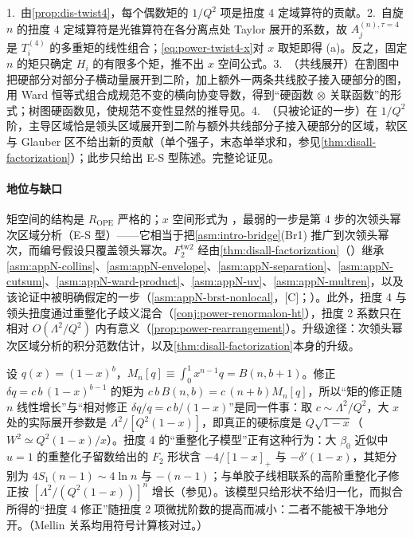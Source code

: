 \begin{proofsketch}
1.~由\cref{prop:dis-twist4}，每个偶数矩的 $1/Q^2$ 项是扭度 4 定域算符的贡献。2.~自旋 $n$ 的扭度 4 定域算符是光锥算符在各分离点处 Taylor 展开的系数，故 $A^{(n),\tau=4}_j$ 是 $T^{(4)}_i$ 的多重矩的线性组合；\eqref{eq:power-twist4-x}对 $x$ 取矩即得 (a)。反之，固定 $n$ 的矩只确定 $H_i$ 的有限多个矩，推不出 $x$ 空间公式。3.~（共线展开）在割图中把硬部分对部分子横动量展开到二阶，加上额外一两条共线胶子接入硬部分的图，用 Ward 恒等式组合成规范不变的横向协变导数，得到“硬函数 $\otimes$ 关联函数”的形式\cite{EllisFurmanskiPetronzio1982,EllisFurmanskiPetronzio1983}；树图硬函数见\cite{Jaffe:1982pm,EllisFurmanskiPetronzio1983}，使规范不变性显然的推导见\cite{Qiu:1988dn}。4.~（只被论证的一步）在 $1/Q^2$ 阶，主导区域恰是领头区域展开到二阶与额外共线部分子接入硬部分的区域，软区与 Glauber 区不给出新的贡献（单个强子，末态单举求和，参见\cref{thm:disall-factorization}）；此步只给出 E-S 型陈述。完整论证见\cite{EllisFurmanskiPetronzio1983,Qiu:1988dn}。
\end{proofsketch}

\paragraph{地位与缺口}
矩空间的结构是 $R_{\mathrm{OPE}}$ 严格的；$x$ 空间形式为 \tagA，最弱的一步是第 4 步的次领头幂次区域分析（E-S 型）——它相当于把\cref{asm:intro-bridge}(Br1) 推广到次领头幂次，而编号假设只覆盖领头幂次。$F_2^{\mathrm{tw2}}$ 经由\cref{thm:disall-factorization}（\tagA）继承 \cref{asm:appN-collins}、\cref{asm:appN-envelope}、\cref{asm:appN-separation}、\cref{asm:appN-cutsum}、\cref{asm:appN-ward-product}、\cref{asm:appN-uv}、\cref{asm:appN-multren}，以及该论证中被明确假定的一步（\cref{asm:appN-brst-nonlocal}，[C]；\cite[第~11.3.2~节]{Collins2011}）。此外，扭度 4 与领头扭度通过重整化子歧义混合（\cref{conj:power-renormalon-ht}），扭度 2 系数只在相对 $O(\Lambda^2/Q^2)$ 内有意义（\cref{prop:power-rearrangement}）。升级途径：次领头幂次区域分析的积分范数估计，以及\cref{thm:disall-factorization}本身的升级。

\begin{example}\label{ex:power-twist4-largex}
设 $q(x)=(1-x)^b$，$M_n[q]\equiv\int_0^1x^{n-1}q=B(n,b+1)$。修正 $\delta q=c\,b\,(1-x)^{b-1}$ 的矩为 $c\,b\,B(n,b)=c\,(n+b)M_n[q]$，所以“矩的修正随 $n$ 线性增长”与“相对修正 $\delta q/q=c\,b/(1-x)$”是同一件事：取 $c\sim\Lambda^2/Q^2$，大 $x$ 处的实际展开参数是 $\Lambda^2/[Q^2(1-x)]$，即真正的硬标度是 $Q\sqrt{1-x}$（$W^2\simeq Q^2(1-x)/x$）。扭度 4 的“重整化子模型”正有这种行为：大 $\beta_0$ 近似中 $u=1$ 的重整化子留数给出的 $F_2$ 形状含 $-4/[1-x]_+$ 与 $-\delta'(1-x)$\cite[式~(5.33)]{Beneke1999}，其矩分别为 $4S_1(n-1)\sim4\ln n$ 与 $-(n-1)$；与单胶子线相联系的高阶重整化子修正按 $[\Lambda^2/(Q^2(1-x))]^n$ 增长\cite[式~(5.37)]{Beneke1999}（参见\cite{BenekeBraun1995b,DasguptaWebber1996}）。该模型只给形状不给归一化，而拟合所得的“扭度 4 修正”随扭度 2 项微扰阶数的提高而减小\cite[第~5.2.4~节]{Beneke1999}：二者不能被干净地分开。（Mellin 关系均用符号计算核对过。）
\end{example}

